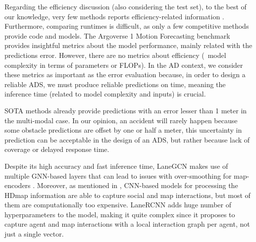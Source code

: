 Regarding the efficiency discussion (also considering the test set), to the best of our knowledge, very few methods reports efficiency-related information \cite{gilles2022gohome, gilles2021home, liu2021multimodal, gao2020vectornet}. Furthermore, comparing runtimes is difficult, as only a few competitive methods provide code and models. The Argoverse 1 Motion Forecasting benchmark \cite{chang2019argoverse} provides insightful metrics about the model performance, mainly related with the predictions error. However, there are no metrics about efficiency (\ie \ model complexity in terms of parameters or \acp{FLOP}). In the \ac{AD} context, we consider these metrics as important as the error evaluation because, in order to design a reliable \ac{ADS}, we must produce reliable predictions on time, meaning the inference time (related to model complexity and inputs) is crucial. 

\ac{SOTA} methods already provide predictions with an error lesser than 1 meter in the multi-modal case. In our opinion, an accident will rarely happen because some obstacle predictions are offset by one or half a meter, this uncertainty in prediction can be acceptable in the design of an \ac{ADS}, but rather because lack of coverage or delayed response time. 

Despite its high accuracy and fast inference time, LaneGCN \cite{liang2020learning} makes use of multiple \ac{GNN}-based layers that can lead to issues with over-smoothing for map-encoders \cite{li2018deeper}. Moreover, as mentioned in \cite{gao2020vectornet}, \ac{CNN}-based models for processing the \ac{HDmap} information are able to capture social and map interactions, but most of them are computationally too expensive. LaneRCNN \cite{zeng2021lanercnn} adds huge number of hyperparameters to the model, making it quite complex since it proposes to capture agent and map interactions with a local interaction graph per agent, not just a single vector. 

